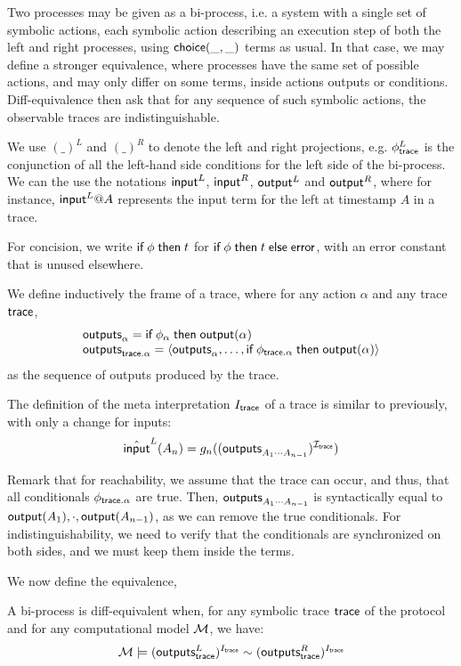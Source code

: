 Two processes may be given as a bi-process, i.e. a system with a single set of
symbolic actions, each symbolic action describing an execution step of both the
left and right processes, using $\mathsf{choice}(\_,\_)$ terms as usual. In that case, we
may define a stronger equivalence, where processes have the same set of possible
actions, and may only differ on some terms, inside actions outputs or
conditions. Diff-equivalence then ask that for any sequence of such symbolic
actions, the observable traces are indistinguishable.

We
use $(\_)^L$ and $(\_)^R$ to denote the left and right projections,
e.g. $\phi_{\textsf{trace}}^L$ is the conjunction of all the left-hand side conditions for
the left side of the bi-process.  We can the use the notations $\textsf{input}^L$, $\textsf{input}^R$, $\textsf{output}^L$
and $\textsf{output}^R$, where for instance, $\textsf{input}^L@A$ represents the input term for
the left at timestamp $A$ in a trace.

For concision, we write $\textsf{if}\; \phi \;\textsf{then}\; t$ for
$\textsf{if}\; \phi \;\textsf{then}\; t \;\textsf{else}\; \mathsf{error}$, with an error constant that is
unused elsewhere.

\begin{definition}
  We define inductively the frame of a trace, where for any action $\alpha$ and any trace $\textsf{trace}$,
  \[\begin{array}{l}
     \textsf{outputs}_{\alpha} = \textsf{if}\; \phi_{\alpha} \;\textsf{then}\; \textsf{output}(\alpha) \\
     \textsf{outputs}_{\textsf{trace} . \alpha} = \langle \textsf{outputs}_\alpha,\dots, \textsf{if}\; \phi_{\textsf{trace} . \alpha} \;\textsf{then}\; \textsf{output}(\alpha) \rangle
     \end{array}\]
  as the sequence of outputs produced by the trace.
\end{definition}

The definition of the meta interpretation $I_{\textsf{trace}}$ of a trace is similar to previously, with only a change for inputs:
\[\hat{\textsf{input}}^L(A_n) = g_n( (\textsf{outputs}_{A_1\cdots A_{n-1}})^{\mathcal{I}_{\textsf{trace}}})\]

  Remark that for reachability, we assume that the trace can occur, and thus,
  that all conditionals $\phi_{\textsf{trace} . \alpha}$ are true. Then,
  $\textsf{outputs}_{A_1\cdots A_{n-1}}$ is syntactically equal to
    $\textsf{output}(A_1),\cdot,\textsf{output}(A_{n-1})$, as we can remove the true
    conditionals. For indistinguishability, we need to verify that the
    conditionals are synchronized on both sides, and we must keep them inside
    the terms.

We now define the equivalence,


\begin{definition}
  A bi-process is diff-equivalent when,
  for any symbolic trace $\textsf{trace}$ of the protocol and
  for any computational model $\mathcal{M}$,
  we have:
  \[\mathcal{M} \models (\textsf{outputs}_{\textsf{trace}}^L)^{I_{\textsf{trace}}}  \sim (\textsf{outputs}_{\textsf{trace}}^R)^{I_{\textsf{trace}}}\]
\end{definition}

